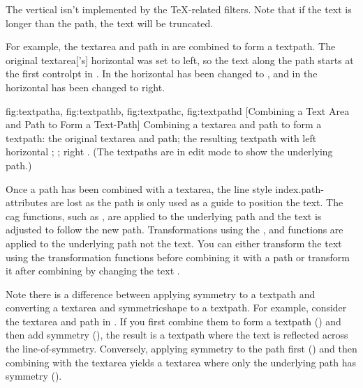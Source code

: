 \begin{important}
The vertical  isn't implemented by the
 \TeX-related filters. Note that if the text is
longer than the path, the text will be truncated.
\end{important}

For example, the \gls{textarea} and \gls{path} in
 are combined to form a \gls*{textpath}.
The original \gls*{textarea}['s] horizontal  was
set to left, so the text along the path starts at the first
\gls{controlpt} in . In
 the horizontal  has been
changed to , and in  the
horizontal  has been changed to right.

{
 {fig:textpatha}{}{},
 {fig:textpathb}{}{},
 {fig:textpathc}{}{},
 {fig:textpathd}{}{}
}
[Combining a Text Area and Path to Form a Text-Path]
{Combining a \gls{textarea} and \gls{path} to form a \gls{textpath}:
 the original \gls{textarea} and \gls{path};
 the resulting \gls{textpath} with left horizontal 
; 
  ; 
 right . 
(The \glspl{textpath} are in edit mode to show the underlying path.)}

Once a \gls{path} has been combined with a \gls{textarea}, the line
style \glspl{index.path-attribute} are lost as the path is only used
as a guide to position the text. The \gls{cag} functions, such as
, are applied to the underlying path and the text
is adjusted to follow the new path.  Transformations using the
,  and 
functions are applied to the underlying path not the text. You can
either transform the text using the transformation functions before
combining it with a path or transform it after combining by changing
the text .

Note there is a difference between applying \gls{symmetry} to a
\gls{textpath} and converting a \gls*{textarea} and
\gls{symmetricshape} to a \gls*{textpath}. For example, consider the
\gls{textarea} and \gls{path} in . If
you first combine them to form a \gls*{textpath}
() and then add symmetry
(), the result is a \gls*{textpath}
where the text is reflected across the \gls{line-of-symmetry}.
Conversely, applying \gls{symmetry} to the path first
() and then combining with the
\gls*{textarea} yields a \gls*{textarea} where only the underlying
path has \gls{symmetry} ().

